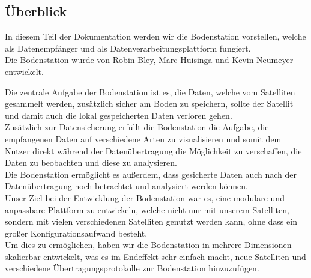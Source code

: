 \subsection{Überblick}
In diesem Teil der Dokumentation werden wir die Bodenstation vorstellen, welche als Datenempfänger und als Datenverarbeitungsplattform fungiert. \\
Die Bodenstation wurde von Robin Bley, Marc Huisinga und Kevin Neumeyer entwickelt.

Die zentrale Aufgabe der Bodenstation ist es, die Daten, welche vom Satelliten gesammelt werden, zusätzlich sicher am Boden zu speichern, sollte der Satellit und damit auch die lokal gespeicherten Daten verloren gehen. \\
Zusätzlich zur Datensicherung erfüllt die Bodenstation die Aufgabe, die empfangenen Daten auf verschiedene Arten zu visualisieren und somit dem Nutzer direkt während der Datenübertragung die Möglichkeit zu verschaffen, die Daten zu beobachten und diese zu analysieren. \\
Die Bodenstation ermöglicht es außerdem, dass gesicherte Daten auch nach der Datenübertragung noch betrachtet und analysiert werden können. \\
Unser Ziel bei der Entwicklung der Bodenstation war es, eine modulare und anpassbare Plattform zu entwickeln, welche nicht nur mit unserem Satelliten, sondern mit vielen verschiedenen Satelliten genutzt werden kann, ohne dass ein großer Konfigurationsaufwand besteht. \\
Um dies zu ermöglichen, haben wir die Bodenstation in mehrere Dimensionen skalierbar entwickelt, was es im Endeffekt sehr einfach macht, neue Satelliten und verschiedene Übertragungsprotokolle zur Bodenstation hinzuzufügen.